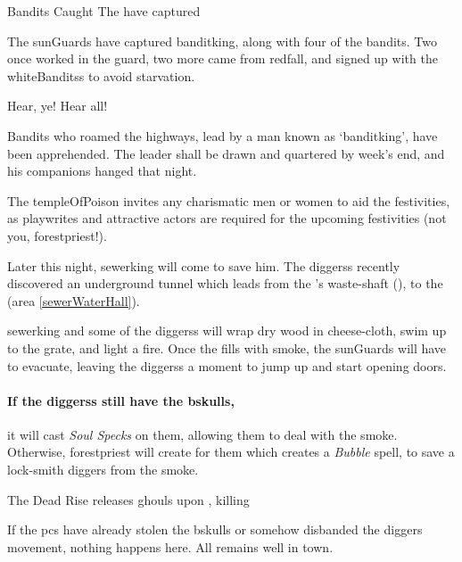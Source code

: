 \humanthief[\npc{\T[2]\M\Hu}{\composeHumanName\ \& \composeHumanName}]

{Bandits Caught}%
{The  have captured }%

\label{banditsCaught}

The \glspl{sunGuard} have captured \gls{banditking}, along with four of the bandits.
Two once worked in the \gls{guard}, two more came from \gls{redfall}, and signed up with the \glspl{whiteBandits} to avoid starvation.

\begin{speechtext}
  Hear, ye!  Hear all!

  Bandits who roamed the highways, lead by a man known as `\gls{banditking}', have been apprehended.
  The leader shall be drawn and quartered by week's end, and his companions hanged that night.

  The \gls{templeOfPoison} invites any charismatic men or women to aid the festivities, as playwrites and attractive actors are required for the upcoming festivities (not you, \gls{forestpriest}!).
\end{speechtext}

Later this night, \gls{sewerking} will come to save him.
The \glspl{diggers} recently discovered an underground tunnel which leads from the 's waste-shaft (), to the  (area \vref{sewerWaterHall}).

\Gls{sewerking} and some of the \glspl{diggers} will wrap dry wood in cheese-cloth, swim up to the grate, and light a fire.
Once the  fills with smoke, the \glspl{sunGuard} will have to evacuate, leaving the \glspl{diggers} a moment to jump up and start opening doors.

\paragraph{If the \glspl{diggers} still have the \gls{bskulls},}
it will cast \textit{Soul Specks} on them, allowing them to deal with the smoke.
Otherwise, \gls{forestpriest} will create  for them which creates a \textit{Bubble} spell, to save a lock-smith \gls{diggers} from the smoke.

{The Dead Rise}%
{ releases ghouls upon , killing }%

If the \glspl{pc} have already stolen the \gls{bskulls} or somehow disbanded the \gls{diggers} movement, nothing happens here.
All remains well in \gls{town}.

